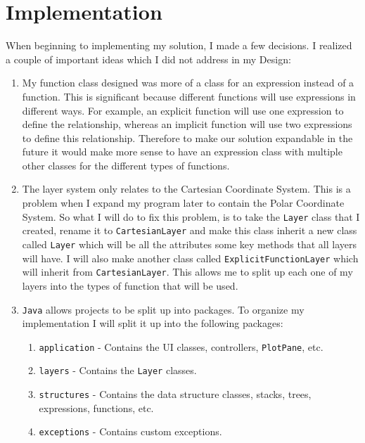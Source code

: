 \documentclass[../../../main.tex]{subfiles}
\begin{document}
\chapter{Implementation}
When beginning to implementing my solution, I made a few decisions. I realized a couple of important ideas which I did not address in my Design:
\begin{enumerate}
\item My function class designed was more of a class for an expression instead of a function. This is significant because different functions will use expressions in different ways. For example, an explicit function will use one expression to define the relationship, whereas an implicit function will use two expressions to define this relationship. Therefore to make our solution expandable in the future it would make more sense to have an expression class with multiple other classes for the different types of functions.
\item The layer system only relates to the Cartesian Coordinate System. This is a problem when I expand my program later to contain the Polar Coordinate System. So what I will do to fix this problem, is to take the \texttt{Layer} class that I created, rename it to \texttt{CartesianLayer} and make this class inherit a new class called \texttt{Layer} which will be all the attributes some key methods that all layers will have. I will also make another class called \texttt{ExplicitFunctionLayer} which will inherit from \texttt{CartesianLayer}. This allows me to split up each one of my layers into the types of function that will be used.
\item \texttt{Java} allows projects to be split up into packages. To organize my implementation I will split it up into the following packages:
	\begin{enumerate}
	\item \texttt{application} - Contains the UI classes, controllers, \texttt{PlotPane}, etc.
	\item \texttt{layers} - Contains the \texttt{Layer} classes.
	\item \texttt{structures} - Contains the data structure classes, stacks, trees, expressions, functions, etc.
	\item \texttt{exceptions} - Contains custom exceptions.
	\end{enumerate}
\end{enumerate}

\newpage
\end{document}
